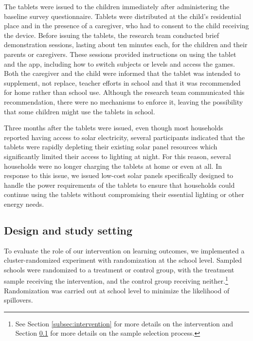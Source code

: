 \documentclass[hidelinks,12pt]{article}
\begin{document}
\begin{singlespace}
The tablets were issued to the children immediately after administering the baseline survey questionnaire. Tablets were distributed at the child's residential place and in the presence of a caregiver, who had to consent to the child receiving the device. Before issuing the tablets, the research team conducted brief demonstration sessions, lasting about ten minutes each, for the children and their parents or caregivers. These sessions provided instructions on using the tablet and the app, including how to switch subjects or levels and access the games. Both the caregiver and the child were informed that the tablet was intended to supplement, not replace, teacher efforts in school and that it was recommended for home rather than school use. Although the research team communicated this recommendation, there were no mechanisms to enforce it, leaving the possibility that some children might use the tablets in school.

Three months after the tablets were issued, even though most households reported having access to solar electricity, several participants indicated that the tablets were rapidly depleting their existing solar panel resources which significantly limited their access to lighting at night. For this reason, several households were no longer charging the tablets at home or even at all. In response to this issue, we issued low-cost solar panels specifically designed to handle the power requirements of the tablets to ensure that households could continue using the tablets without compromising their essential lighting or other energy needs. 


\subsection{Design and study setting}\label{subsec:design}
To evaluate the role of our intervention on learning outcomes, we implemented a cluster-randomized experiment with randomization at the school level. Sampled schools were randomized to a treatment or control group, with the treatment sample receiving the intervention, and the control group receiving neither.\footnote{See Section \ref{subsec:intervention} for more details on the intervention and Section \ref{subsec:design} for more details on the sample selection process.} Randomization was carried out at school level to minimize the likelihood of spillovers. 


\end{singlespace}
\end{document}
